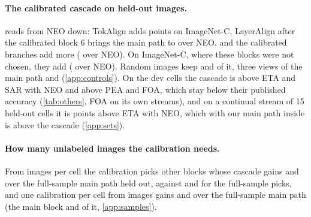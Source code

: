 \documentclass{article}
\newcommand{\tok}{TokAlign}
\newcommand{\layer}{LayerAlign}
\newcommand{\neo}{NEO}
\begin{document}
\paragraph{The calibrated cascade on held-out images.}  reads from \neo{} down: \tok{} adds  points on ImageNet-C, \layer{} after the calibrated block 6 brings the main path to  over \neo{}, and the calibrated branches add  more ( over \neo{}). On ImageNet-$\overline{\text{C}}$, where these blocks were not chosen, they add  ( over \neo{}). Random images keep  and  of it, three views of the main path  and  (\cref{app:controls}). On the dev cells the cascade is above ETA and SAR with \neo{} and above PEA and FOA, which stay below their published accuracy (\cref{tab:others}, FOA on its own streams), and on a continual stream of 15 held-out cells it is  points above ETA with \neo{}, which with our main path inside is  above the cascade (\cref{app:sets}).

\paragraph{How many unlabeled images the calibration needs.} From  images per cell the calibration picks other blocks whose cascade gains  and  over the full-sample main path held out, against  and  for the full-sample picks, and one calibration per cell from  images gains  and  over the full-sample main path (the main block  and  of it, \cref{app:samples}).
\end{document}
